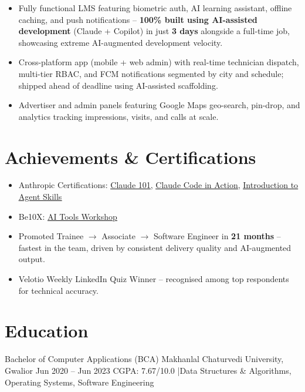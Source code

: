 \documentclass{resume}
\begin{document}
\vspace{1pt}

\begin{itemize}
  \item Fully functional LMS featuring biometric auth, AI learning assistant, offline caching, and push notifications -- \textbf{100\% built using AI-assisted development} (Claude + Copilot) in just \textbf{3 days} alongside a full-time job, showcasing extreme AI-augmented development velocity.
\end{itemize}

\vspace{1pt}

\begin{itemize}
  \item Cross-platform app (mobile + web admin) with real-time technician dispatch, multi-tier RBAC, and FCM notifications segmented by city and schedule; shipped ahead of deadline using AI-assisted scaffolding.
\end{itemize}

\vspace{1pt}

\begin{itemize}
  \item Advertiser and admin panels featuring Google Maps geo-search, pin-drop, and analytics tracking impressions, visits, and calls at scale.
\end{itemize}

\section{Achievements \& Certifications}

\begin{itemize}
  \item Anthropic Certifications: \href{https://verify.skilljar.com/c/738qqbw7mdzg}{\underline{Claude 101}}, \href{https://verify.skilljar.com/c/y7sjp6gizmbk}{\underline{Claude Code in Action}}, \href{https://verify.skilljar.com/c/yhi5c9jiyomj}{\underline{Introduction to Agent Skills}}
  \item Be10X: \href{https://certx.in/certificate/0270772f-3809-4400-b29b-1e1c61cd09971132989}{\underline{AI Tools Workshop}}
  \item Promoted Trainee $\to$ Associate $\to$ Software Engineer in \textbf{21 months} -- fastest in the team, driven by consistent delivery quality and AI-augmented output.
  \item Velotio Weekly LinkedIn Quiz Winner -- recognised among top respondents for technical accuracy.
\end{itemize}

\section{Education}

\eduentry
  {Bachelor of Computer Applications (BCA)}
  {Makhanlal Chaturvedi University, Gwalior}
  {Jun 2020 -- Jun 2023}
  {CGPA: 7.67/10.0 \quad|\quad Data Structures \& Algorithms, Operating Systems, Software Engineering}
\end{document}
